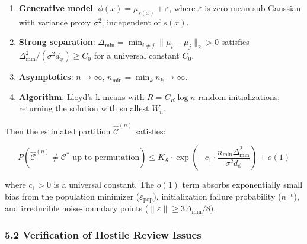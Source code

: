\documentclass[
  12pt,
]{ctexart}
\providecommand{\tightlist}{%
  \setlength{\itemsep}{0pt}\setlength{\parskip}{0pt}}
\begin{document}
\begin{enumerate}
\def\labelenumi{\arabic{enumi}.}
\tightlist
\item
  \textbf{Generative model}: \(\phi(x) = \mu_{s(x)} + \varepsilon\),
  where \(\varepsilon\) is zero-mean sub-Gaussian with variance proxy
  \(\sigma^2\), independent of \(s(x)\).
\item
  \textbf{Strong separation}:
  \(\Delta_{\min} = \min_{i \neq j} \|\mu_i - \mu_j\|_2 > 0\) satisfies
  \(\Delta_{\min}^2 / (\sigma^2 d_\phi) \geq C_0\) for a universal
  constant \(C_0\).
\item
  \textbf{Asymptotics}: \(n \to \infty\),
  \(n_{\min} = \min_k n_k \to \infty\).
\item
  \textbf{Algorithm}: Lloyd's k-means with \(R = C_R \log n\) random
  initializations, returning the solution with smallest \(W_n\).
\end{enumerate}

Then the estimated partition \(\hat{\mathcal{C}}^{(n)}\) satisfies:

\[\boxed{\;P\!\left(\hat{\mathcal{C}}^{(n)} \neq \mathcal{C}^* \text{ up to permutation}\right) \leq K_{\mathcal{S}} \cdot \exp\!\left(-c_1 \cdot \frac{n_{\min} \Delta_{\min}^2}{\sigma^2 d_\phi}\right) + o(1)\;}\]

where \(c_1 > 0\) is a universal constant. The \(o(1)\) term absorbs
exponentially small bias from the population minimizer
(\(\varepsilon_{\text{pop}}\)), initialization failure probability
(\(n^{-c}\)), and irreducible noise-boundary points
(\(\|\varepsilon\| \geq 3\Delta_{\min}/8\)).

\subsubsection{5.2 Verification of Hostile Review
Issues}\label{verification-of-hostile-review-issues}
\end{document}
